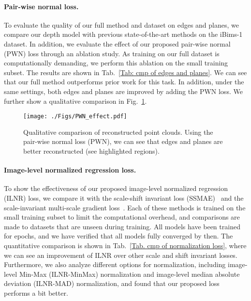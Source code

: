  \paragraph{Pair-wise normal loss.} 
 To evaluate the quality of our full method and dataset on edges and planes, we compare our depth model with previous state-of-the-art methods on the iBims-1 dataset.
 In addition, we evaluate the effect of our proposed pair-wise normal (PWN) loss through an ablation study. As training on our full dataset is computationally demanding, we perform this ablation on the small training subset.
The results are shown in Tab.~\ref{Tab: cmp of edges and planes}. 
 We can see that our full method outperforms prior work for this task.
 In addition, under the same settings, both edges and planes are improved by adding the PWN loss. 
We further show a qualitative comparison in Fig.~\ref{Fig: cmp of pcd with PWN. }.





\begin{figure}[t]
\centering
\texttt{[image: ./Figs/PWN\_effect.pdf]}
\caption{Qualitative comparison of reconstructed point clouds. Using the pair-wise normal loss (PWN), we can see that edges and planes are better reconstructed (see highlighted regions).}
\label{Fig: cmp of pcd with PWN. }
\vspace{-1em}
\end{figure}

\paragraph{Image-level normalized regression loss.}
To show the effectiveness of our proposed image-level normalized regression (ILNR) loss, we compare it with the scale-shift invariant loss (SSMAE)~\cite{Ranftl2020} and the scale-invariant multi-scale gradient loss~\cite{wang2019web}. 
Each of these methods is trained on the small training subset to limit the computational overhead, and comparisons are made to datasets that are unseen during training. 
All models have been trained for  epochs, and we have verified that all models fully converged by then. 
The quantitative comparison is shown in Tab.~\ref{Tab. cmp of normalization loss}, where we can see an improvement of ILNR over other scale and shift invariant losses. 
Furthermore, we also analyze different options for normalization, including image-level Min-Max (ILNR-MinMax) normalization and image-level median absolute deviation (ILNR-MAD) normalization, and found that our proposed loss performs a bit better.



